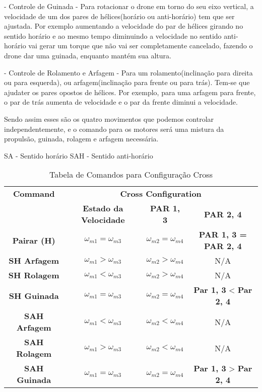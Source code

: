 - Controle de Guinada - Para rotacionar o drone em torno do seu eixo vertical, a velocidade de um dos pares de hélices(horário ou anti-horário) tem que ser ajustada. Por exemplo aumentando a velocidade do par de hélices girando no sentido horário e ao mesmo tempo diminuindo a velocidade no sentido anti-horário vai gerar um torque que não vai ser completamente cancelado, fazendo o drone dar uma guinada, enquanto mantém sua altura.

- Controle de Rolamento e Arfagem - Para um rolamento(inclinação para direita ou para esquerda), ou arfagem(inclinação para frente ou para trás). Tem-se que ajudater os pares opostos de hélices. Por exemplo, para uma arfagem para frente, o par de trás aumenta de velocidade e o par da frente diminui a velocidade.

Sendo assim esses são os quatro movimentos que podemos controlar independentemente, e o comando para os motores será uma mistura da propulsão, guinada, rolagem e arfagem necessária.

SA - Sentido horário
SAH - Sentido anti-horário

\begin{table}[h!]
	\centering
	\begin{tabular}{|c|c|c|c|}
	\hline
	{\textbf{Command}} & \multicolumn{3}{c|}{\textbf{Cross Configuration}} \\ \cline{2-4}
	 & \textbf{Estado da Velocidade} & \textbf{PAR 1, 3} & \textbf{PAR 2, 4} \\ \hline
	\textbf{Pairar (H)} & $\omega_{m1} = \omega_{m3}$ & $\omega_{m2} = \omega_{m4}$ & \textbf{PAR 1, 3 = PAR 2, 4} \\ \hline
	\textbf{SH Arfagem} & $\omega_{m1} > \omega_{m3}$ & $\omega_{m2} > \omega_{m4}$ & N/A \\ \hline
	\textbf{SH Rolagem} & $\omega_{m1} < \omega_{m3}$ & $\omega_{m2} > \omega_{m4}$ & N/A \\ \hline
	\textbf{SH Guinada} & $\omega_{m1} = \omega_{m3}$ & $\omega_{m2} = \omega_{m4}$ & \textbf{Par 1, 3} < \textbf{ Par 2, 4} \\ \hline
	\textbf{SAH Arfagem} & $\omega_{m1} < \omega_{m3}$ & $\omega_{m2} < \omega_{m4}$ & N/A \\ \hline
	\textbf{SAH Rolagem} & $\omega_{m1} > \omega_{m3}$ & $\omega_{m2} < \omega_{m4}$ & N/A \\ \hline
	\textbf{SAH Guinada} & $\omega_{m1} = \omega_{m3}$ & $\omega_{m2} = \omega_{m4}$ & \textbf{Par 1, 3} > \textbf{ Par 2, 4}\\ \hline
	\end{tabular}
	\caption{Tabela de Comandos para Configuração Cross}
	\label{tab:control-config}
	\end{table}

